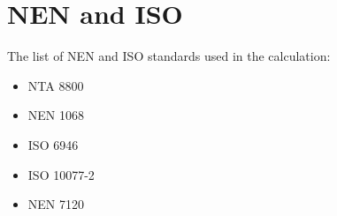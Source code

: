 \section{NEN and ISO}

The list of NEN and ISO standards used in the calculation:

\begin{itemize}
    \item NTA 8800
    \item NEN 1068
    \item ISO 6946
    \item ISO 10077-2
    \item NEN 7120
\end{itemize}


